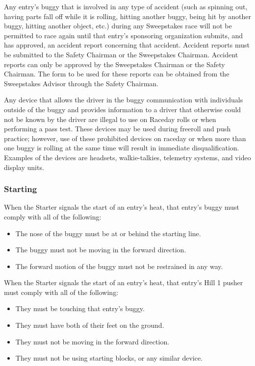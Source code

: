 	Any entry's buggy that is involved in any type of accident (such as spinning out, having parts fall off while it is rolling, hitting another buggy, being hit by another buggy, hitting another object, etc.) during any Sweepstakes race will not be permitted to race again until that entry's sponsoring organization submits, and has approved, an accident report concerning that accident. Accident reports must be submitted to the Safety Chairman or the Sweepstakes Chairman. Accident reports can only be approved by the Sweepstakes Chairman or the Safety Chairman. The form to be used for these reports can be obtained from the Sweepstakes Advisor through the Safety Chairman.

	Any device that allows the driver in the buggy communication with individuals outside of the buggy and provides information to a driver that otherwise could not be known by the driver are illegal to use on Raceday rolls or when performing a pass test. These devices may be used during freeroll and push practice; however, use of these prohibited devices on raceday or when more than one buggy is rolling at the same time will result in immediate disqualification. Examples of the devices are headsets, walkie-talkies, telemetry systems, and video display units.

\subsubsection{Starting}

	When the Starter signals the start of an entry's heat, that entry's buggy must comply with all of the following:

	\begin{itemize}

		\item The nose of the buggy must be at or behind the starting line.

		\item The buggy must not be moving in the forward direction.

		\item The forward motion of the buggy must not be restrained in any way.

	\end{itemize}

	\noindent When the Starter signals the start of an entry's heat, that entry's Hill 1 pusher must comply with all of the following:

	\begin{itemize}

		\item They must be touching that entry's buggy.

		\item They must have both of their feet on the ground.

		\item They must not be moving in the forward direction.

		\item They must not be using starting blocks, or any similar device.

	\end{itemize}

